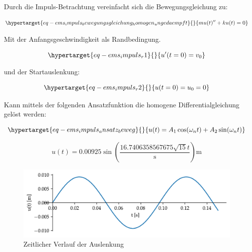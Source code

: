 \documentclass[
  letterpaper,
  DIV=11]{scrreprt}
\begin{document}
Durch die Impuls-Betrachtung vereinfacht sich die Bewegungsgleichung zu:

\begin{equation}\protect\hypertarget{eq-ems_impuls_bewegungsgleichung_homogen_ungedaempft}{}{
m u(t)'' + k u(t) = 0
}\label{eq-ems_impuls_bewegungsgleichung_homogen_ungedaempft}\end{equation}

Mit der Anfangsgeschwindigkeit als Randbedingung.

\begin{equation}\protect\hypertarget{eq-ems_impuls_r1}{}{
u'(t=0) = v_0  
}\label{eq-ems_impuls_r1}\end{equation}

und der Startauslenkung:

\begin{equation}\protect\hypertarget{eq-ems_impuls_r2}{}{
u(t=0) = u_0 = 0 
}\label{eq-ems_impuls_r2}\end{equation}

Kann mittels der folgenden Ansatzfunktion die homogene
Differentialgleichung gelöst werden:

\begin{equation}\protect\hypertarget{eq-ems_impuls_ansatz_beweg}{}{
u(t) = A_1 \cos(\omega_n t) + A_2 \sin(\omega_n t)
}\label{eq-ems_impuls_ansatz_beweg}\end{equation}

\begin{equation}u{\left(t \right)} = 0.00925 \sin{\left(\frac{16.7406358567675 \sqrt{15} t}{\text{s}} \right)} \text{m}\end{equation}

\begin{figure}[H]

{\centering \includegraphics{index_files/mediabag/ems_02_files/figure-pdf/fig-ems_impuls_bewegungsfunk-output-1.pdf}

}

\caption{\label{fig-ems_impuls_bewegungsfunk}Zeitlicher Verlauf der
Auslenkung}

\end{figure}
\end{document}

